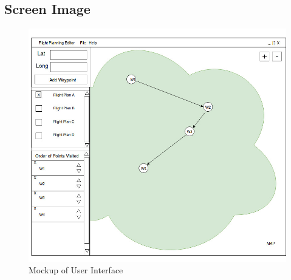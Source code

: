 \documentclass[12pt, letterpaper]{article}
\begin{document}
	\subsection{Screen Image}
    \begin{figure}[h!]
      \includegraphics[width=0.95\linewidth]{figs/FlightPlanning_Interface}\caption{Mockup of User Interface}
    \end{figure}
\end{document}

